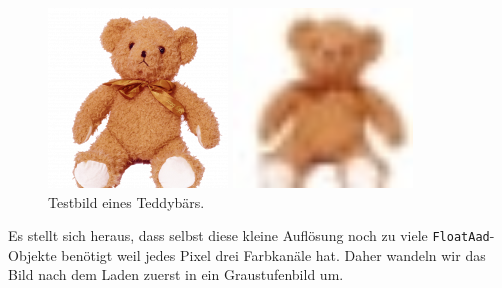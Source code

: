 \documentclass[
  a4paper,
  DIV=11]{scrreprt}
\theoremstyle{definition}
\theoremstyle{definition}
\theoremstyle{remark}
\begin{document}
\begin{figure}

\begin{minipage}[b]{0.50\linewidth}

{\centering 

\includegraphics{Bear_original.png}

}

\end{minipage}%
%
\begin{minipage}[b]{0.50\linewidth}

{\centering 

\includegraphics[width=1.875in,height=\textheight]{Bear30.jpg}

}

\end{minipage}%

\caption{\label{fig-teddys}Testbild eines Teddybärs.}

\end{figure}

Es stellt sich heraus, dass selbst diese kleine Auflösung noch zu viele
\texttt{FloatAad}-Objekte benötigt weil jedes Pixel drei Farbkanäle hat.
Daher wandeln wir das Bild nach dem Laden zuerst in ein Graustufenbild
um.
\end{document}
